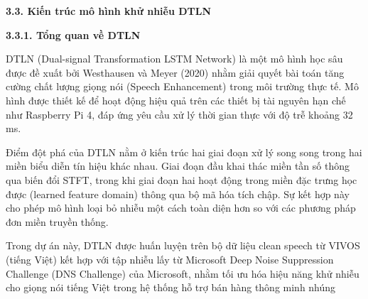 \documentclass[
  13pt,
]{article}
\begin{document}
\textbf{3.3. Kiến trúc mô hình khử nhiễu DTLN}

\textbf{3.3.1. Tổng quan về DTLN}

DTLN (Dual-signal Transformation LSTM Network) là một mô hình học sâu
được đề xuất bởi Westhausen và Meyer (2020) nhằm giải quyết bài toán
tăng cường chất lượng giọng nói (Speech Enhancement) trong môi trường
thực tế. Mô hình được thiết kế để hoạt động hiệu quả trên các thiết bị
tài nguyên hạn chế như Raspberry Pi 4, đáp ứng yêu cầu xử lý thời gian
thực với độ trễ khoảng 32 ms.

Điểm đột phá của DTLN nằm ở kiến trúc hai giai đoạn xử lý song song
trong hai miền biểu diễn tín hiệu khác nhau. Giai đoạn đầu khai thác
miền tần số thông qua biến đổi STFT, trong khi giai đoạn hai hoạt động
trong miền đặc trưng học được (learned feature domain) thông qua bộ mã
hóa tích chập. Sự kết hợp này cho phép mô hình loại bỏ nhiễu một cách
toàn diện hơn so với các phương pháp đơn miền truyền thống.

Trong dự án này, DTLN được huấn luyện trên bộ dữ liệu clean speech từ
VIVOS (tiếng Việt) kết hợp với tập nhiễu lấy từ Microsoft Deep Noise
Suppression Challenge (DNS Challenge) của Microsoft, nhằm tối ưu hóa
hiệu năng khử nhiễu cho giọng nói tiếng Việt trong hệ thống hỗ trợ bán
hàng thông minh nhúng
\end{document}
